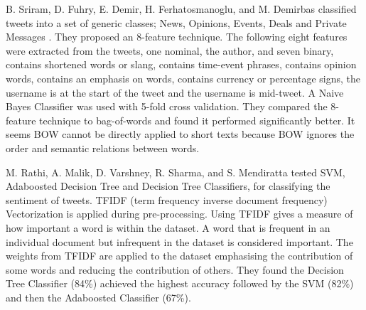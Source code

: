 B. Sriram, D. Fuhry, E. Demir, H. Ferhatosmanoglu, and M. Demirbas classified tweets into a set of generic classes; News, Opinions, Events, Deals and Private Messages \cite{sriram2010}. They proposed an 8-feature technique. The following eight features were extracted from the tweets, one nominal, the author, and seven binary, contains shortened words or slang, contains time-event phrases, contains opinion words, contains an emphasis on words, contains currency or percentage signs, the username is at the start of the tweet and the username is mid-tweet. A Naive Bayes Classifier was used with 5-fold cross validation. They compared the 8-feature technique to bag-of-words and found it performed significantly better. It seems BOW cannot be directly applied to short texts because BOW ignores the order and semantic relations between words.

M. Rathi, A. Malik, D. Varshney, R. Sharma, and S. Mendiratta \cite{Raithi2018} tested SVM, Adaboosted Decision Tree and Decision Tree Classifiers, for classifying the sentiment of tweets. TFIDF (term frequency inverse document frequency) Vectorization is applied during pre-processing. Using TFIDF gives a measure of how important a word is within the dataset. A word that is frequent in an individual document but infrequent in the dataset is considered important. The weights from TFIDF are applied to the dataset emphasising the contribution of some words and reducing the contribution of others. They found the Decision Tree Classifier (84\%) achieved the highest accuracy followed by the SVM (82\%) and then the Adaboosted Classifier (67\%). 

